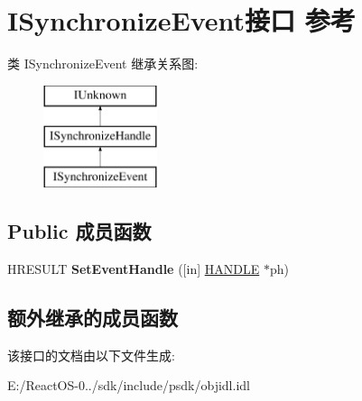 \hypertarget{interface_i_synchronize_event}{}\section{I\+Synchronize\+Event接口 参考}
\label{interface_i_synchronize_event}
类 I\+Synchronize\+Event 继承关系图\+:\begin{figure}[H]
\begin{center}
\leavevmode
\includegraphics[height=3.000000cm]{interface_i_synchronize_event}
\end{center}
\end{figure}
\subsection*{Public 成员函数}
\begin{DoxyCompactItemize}
\item 
\mbox{\label{interface_i_synchronize_event_a15468483324591cf8fac388cd711b990}} 
H\+R\+E\+S\+U\+LT {\bfseries Set\+Event\+Handle} (\mbox{[}in\mbox{]} \hyperlink{interfacevoid}{H\+A\+N\+D\+LE} $\ast$ph)
\end{DoxyCompactItemize}
\subsection*{额外继承的成员函数}


该接口的文档由以下文件生成\+:\begin{DoxyCompactItemize}
\item 
E\+:/\+React\+O\+S-\/0../sdk/include/psdk/objidl.\+idl\end{DoxyCompactItemize}
